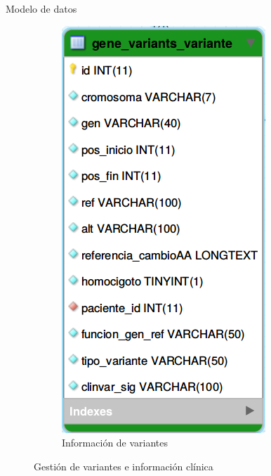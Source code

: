 \documentclass[xcolor=dvipsnames]{beamer}
\begin{document}
\begin{frame}{Modelo de datos}
\begin{figure}
\begin{subfigure}[b]{0.2\textwidth}
			\includegraphics[width=\textwidth]{tabla2.png}
			\caption{Información de variantes}
		\end{subfigure}
		\caption{Gestión de variantes e información clínica}
	\end{figure}
\end{frame}
    
\end{document}
